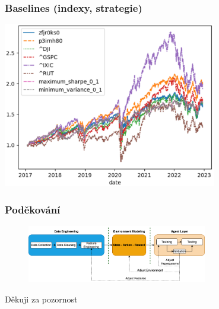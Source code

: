 \begin{frame}
    \frametitle{Baselines (indexy, strategie)}
    \begin{center}
        \centering
        \includegraphics[width=0.7\textwidth]{img/returns}
    \end{center}
\end{frame}


\begin{frame}
    \frametitle{Poděkování}
    \begin{center}
        \begin{figure}
            \centering
            \includegraphics[width=0.7\textwidth]{img/navrh_reseni}
        \end{figure}
        \vspace{0.5cm}
        \Huge Děkuji za pozornost
    \end{center}
\end{frame}

